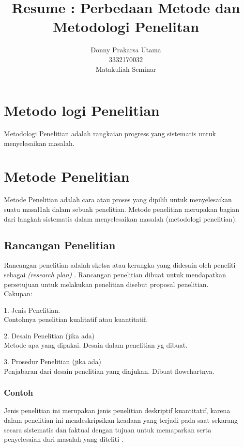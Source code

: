 \documentclass[10pt]{IEEEtran}
\begin{document}
\title{Resume : Perbedaan Metode dan Metodologi Penelitan}
\author{Donny Prakarsa Utama\\3332170032\\ Matakuliah Seminar}
\maketitle

\section{Metodo logi Penelitian}
Metodologi Penelitian adalah rangkaian progress yang sistematis untuk menyelesaikan masalah\cite{youtube:1}.
\section{Metode Penelitian}
Metode Penelitian adalah cara atau proses yang dipilih untuk menyelesaikan suatu masal1ah dalam sebuah penelitian. Metode penelitian merupakan bagian dari langkah sistematis dalam menyelesaikan masalah (metodologi penelitian)\cite{youtube:1}.
\subsection{Rancangan Penelitian} Rancangan penelitian adalah sketsa atau kerangka yang didesain oleh peneliti sebagai
\textit{(research plan)}  . Rancangan penelitian dibuat untuk mendapatkan persetujuan untuk melakukan penelitian disebut proposal penelitian\cite{youtube:1}.\\
Cakupan:

1. Jenis Penelitian. \\ Contohnya penelitian kualitatif atau kuantitatif.

2. Desain Penelitian (jika ada) \\
Metode apa yang dipakai. Desain dalam penelitian yg dibuat.

3. Prosedur Penelitian (jika ada) \\
Penjabaran dari desain penelitian yang diajukan. Dibuat flowchartnya.


\subsubsection*{Contoh}
Jenis penelitian ini merupakan jenis penelitian deskriptif kuantitatif, karena
dalam penelitian ini mendeskripsikan keadaan yang terjadi pada saat sekarang
secara sistematis dan faktual dengan tujuan untuk memaparkan serta
penyelesaian dari masalah yang diteliti \cite{unila:2}.
\end{document}
